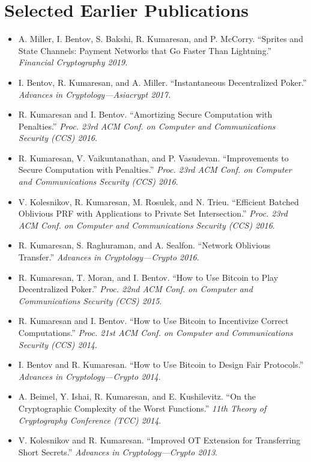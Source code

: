 \documentclass[11pt]{article}
\begin{document}
\section{Selected Earlier Publications}
\begin{itemize}[leftmargin=*, noitemsep, topsep=0pt]
    \item A. Miller, I. Bentov, S. Bakshi, R. Kumaresan, and P. McCorry. ``Sprites and State Channels: Payment Networks that Go Faster Than Lightning.'' \textit{Financial Cryptography 2019.}
    \item I. Bentov, R. Kumaresan, and A. Miller. ``Instantaneous Decentralized Poker.'' \textit{Advances in Cryptology—Asiacrypt 2017.}
    \item R. Kumaresan and I. Bentov. ``Amortizing Secure Computation with Penalties.'' \textit{Proc. 23rd ACM Conf. on Computer and Communications Security (CCS) 2016}.
    \item R. Kumaresan, V. Vaikuntanathan, and P. Vasudevan. ``Improvements to Secure Computation with Penalties.'' \textit{Proc. 23rd ACM Conf. on Computer and Communications Security (CCS) 2016}.
    \item V. Kolesnikov, R. Kumaresan, M. Rosulek, and N. Trieu. ``Efficient Batched Oblivious PRF with Applications to Private Set Intersection.'' \textit{Proc. 23rd ACM Conf. on Computer and Communications Security (CCS) 2016}.
    \item R. Kumaresan, S. Raghuraman, and A. Sealfon. ``Network Oblivious Transfer.'' \textit{Advances in Cryptology—Crypto 2016}.
    \item R. Kumaresan, T. Moran, and I. Bentov. ``How to Use Bitcoin to Play Decentralized Poker.'' \textit{Proc. 22nd ACM Conf. on Computer and Communications Security (CCS) 2015}.
    \item R. Kumaresan and I. Bentov. ``How to Use Bitcoin to Incentivize Correct Computations.'' \textit{Proc. 21st ACM Conf. on Computer and Communications Security (CCS) 2014}.
    \item I. Bentov and R. Kumaresan. ``How to Use Bitcoin to Design Fair Protocols.'' \textit{Advances in Cryptology—Crypto 2014}.
    \item A. Beimel, Y. Ishai, R. Kumaresan, and E. Kushilevitz. ``On the Cryptographic Complexity of the Worst Functions.'' \textit{11th Theory of Cryptography Conference (TCC) 2014}.
    \item V. Kolesnikov and R. Kumaresan. ``Improved OT Extension for Transferring Short Secrets.'' \textit{Advances in Cryptology—Crypto 2013}.

\end{itemize}
\end{document}
